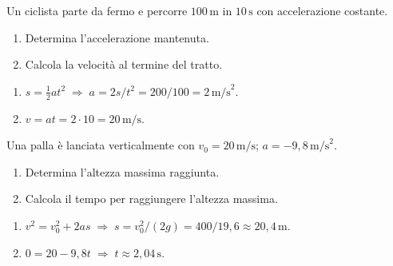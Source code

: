 
\begin{question}[ID=1.3, subtitle={Ciclista che parte da fermo percorre 100 m}, tags={mua, accelerazione}, difficulty=facile]
Un ciclista parte da fermo e percorre $100 \, \text{m}$ in $10 \, \text{s}$ con accelerazione costante.
\begin{enumerate}
    \item Determina l'accelerazione mantenuta.
    \item Calcola la velocità al termine del tratto.
\end{enumerate}
\begin{solution}
    \begin{enumerate}
        \item $s = \tfrac{1}{2}at^2 \;\Rightarrow\; a = 2s/t^2 = 200/100 = 2 \, \text{m/s}^2$.
        \item $v = at = 2 \cdot 10 = 20 \, \text{m/s}$.
    \end{enumerate}
\end{solution}
\end{question}


\begin{question}[ID=1.4, subtitle={Palla lanciata verticalmente verso l'alto}, tags={mua, caduta libera}, difficulty=facile]
Una palla è lanciata verticalmente con $v_0 = 20 \, \text{m/s}$; $a = -9{,}8 \, \text{m/s}^2$.
\begin{enumerate}
    \item Determina l'altezza massima raggiunta.
    \item Calcola il tempo per raggiungere l'altezza massima.
\end{enumerate}
\begin{solution}
    \begin{enumerate}
        \item $v^2 = v_0^2 + 2as \;\Rightarrow\; s = v_0^2/(2g) = 400/19{,}6 \approx 20{,}4 \, \text{m}$.
        \item $0 = 20 - 9{,}8t \;\Rightarrow\; t \approx 2{,}04 \, \text{s}$.
    \end{enumerate}
\end{solution}
\end{question}


